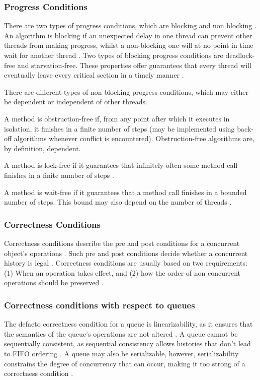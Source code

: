 \documentclass[a4paper, 12pt, titlepage]{article}
\begin{document}
\begin{singlespace}
\subsubsection{Progress Conditions}
There are two types of progress conditions, which are blocking and non blocking \cite[Chapter~3.7]{herlihy2020art}. An algorithm is blocking if an unexpected delay in one thread can prevent other threads from making progress, whilst a non-blocking one will at no point in time wait for another thread \cite[Chapter~3.7]{herlihy2020art}. Two types of blocking progress conditions are deadlock-free and starvation-free. These properties offer guarantees that every thread will eventually leave every critical section in a timely manner \cite[Chapter~3.7.1]{herlihy2020art}. 

There are different types of non-blocking progress conditions, which may either be dependent or independent of other threads. 

A method is obstruction-free if, from any point after which it executes in isolation, it finishes in a finite number of steps (may be implemented using back-off algorithms whenever conflict is encountered)\cite{herlihy2020art,herlihy2003obstruction}. Obstruction-free algorithms are, by definition, dependent.

A method is lock-free if it guarantees that infinitely often some method call finishes in a finite number of steps \cite{herlihy2020art}.

A method is wait-free if it guarantees that a method call finishes in a bounded number of steps. This bound may also depend on the number of threads \cite{herlihy2020art}.

\subsubsection{Correctness Conditions}
Correctness conditions describe the pre and post conditions for a concurrent object's operations \cite{herlihy2020art}. Such pre and post conditions decide whether a concurrent history is legal \cite{herlihy1990linearizability}. Correctness conditions are usually based on two requirements: (1) When an operation takes effect, and (2) how the order of non concurrent operations should be preserved \cite{herlihy1990linearizability}.

\subsubsection{Correctness conditions with respect to queues}
The defacto correctness condition for a queue is linearizability, as it ensures that the semantics of the queue's operations are not altered \cite{mellor1987concurrent}. A queue cannot be sequentially consistent, as sequential consistency allows histories that don't lead to FIFO ordering \cite{ herlihy2020art, herlihy1990linearizability}. A queue may also be serializable, however, serializability constrains the degree of concurrency that can occur, making it too strong of a correctness condition \cite{herlihy2020art,herlihy1990linearizability}.


\end{singlespace}
\end{document}
